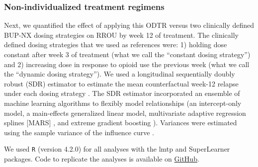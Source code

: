 \documentclass[11pt]{article}
\renewcommand{\d}{\mathsf{d}}
\newcommand{\E}{\mathsf{E}}
\begin{document}
\subsubsection*{Non-individualized treatment regimens}

Next, we quantified the effect of applying this ODTR versus two clinically defined BUP-NX dosing strategies on RROU by week 12 of treatment. The clinically defined dosing strategies that we used as references were: 1) holding dose constant after week 3 of treatment (what we call the ``constant dosing strategy'') and 2) increasing dose in response to opioid use the previous week (what we call the ``dynamic dosing strategy''). We used a longitudinal sequentially doubly robust (SDR) estimator to estimate the mean counterfactual week-12 relapse under each dosing strategy \citep{luedtke2018sequential}. The SDR estimator incorporated an ensemble of machine learning algorithms \cite{van2007super} to flexibly model relationships (an intercept-only model, a main-effects generalized linear model, multivariate adaptive regression splines [MARS] \cite{friedman1991multivariate}, and extreme gradient boosting \cite{chenXGBoost}). Variances were estimated using the sample variance of the influence curve \cite{luedtke2018sequential}. 

We used \texttt{R} (version 4.2.0) for all analyses \cite{R} with the lmtp \cite{lmtpR, lmtpJASA} and SuperLearner \citep{SuperLearnerPkg} packages. Code to replicate the analyses is available on \href{https://github.com/Rudolph-et-al-MSPH-Epidemiology/odtr}{GitHub}.

\end{document}
